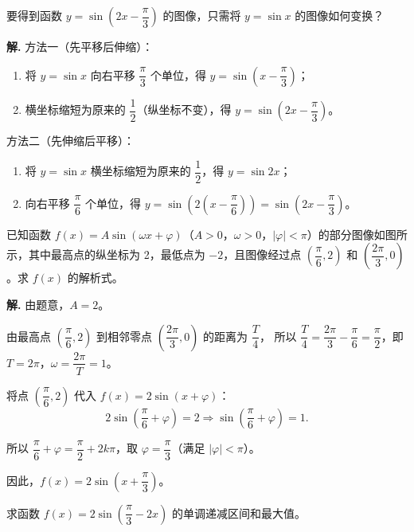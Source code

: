 \documentclass[11pt]{ctexrep}
\begin{document}
\begin{example}[图像变换]
    要得到函数 $y = \sin\left(2x - \dfrac{\pi}{3}\right)$ 的图像，只需将 $y = \sin x$ 的图像如何变换？
\end{example}

\textbf{解.} 方法一（先平移后伸缩）：
\begin{enumerate}
    \item 将 $y = \sin x$ 向右平移 $\dfrac{\pi}{3}$ 个单位，得 $y = \sin\left(x - \dfrac{\pi}{3}\right)$；
    \item 横坐标缩短为原来的 $\dfrac{1}{2}$（纵坐标不变），得 $y = \sin\left(2x - \dfrac{\pi}{3}\right)$。
\end{enumerate}

方法二（先伸缩后平移）：
\begin{enumerate}
    \item 将 $y = \sin x$ 横坐标缩短为原来的 $\dfrac{1}{2}$，得 $y = \sin 2x$；
    \item 向右平移 $\dfrac{\pi}{6}$ 个单位，得 $y = \sin\left(2\left(x - \dfrac{\pi}{6}\right)\right) = \sin\left(2x - \dfrac{\pi}{3}\right)$。
\end{enumerate}

\begin{example}[由图像求解析式]
    已知函数 $f(x) = A\sin(\omega x + \varphi)$（$A > 0$，$\omega > 0$，$|\varphi| < \pi$）的部分图像如图所示，其中最高点的纵坐标为 2，最低点为 $-2$，且图像经过点 $\left(\dfrac{\pi}{6}, 2\right)$ 和 $\left(\dfrac{2\pi}{3}, 0\right)$。求 $f(x)$ 的解析式。
\end{example}

\textbf{解.} 由题意，$A = 2$。

由最高点 $\left(\dfrac{\pi}{6}, 2\right)$ 到相邻零点 $\left(\dfrac{2\pi}{3}, 0\right)$ 的距离为 $\dfrac{T}{4}$，
所以 $\dfrac{T}{4} = \dfrac{2\pi}{3} - \dfrac{\pi}{6} = \dfrac{\pi}{2}$，即 $T = 2\pi$，$\omega = \dfrac{2\pi}{T} = 1$。

将点 $\left(\dfrac{\pi}{6}, 2\right)$ 代入 $f(x) = 2\sin(x + \varphi)$：
\[
    2\sin\left(\frac{\pi}{6} + \varphi\right) = 2 \Rightarrow \sin\left(\frac{\pi}{6} + \varphi\right) = 1.
\]

所以 $\dfrac{\pi}{6} + \varphi = \dfrac{\pi}{2} + 2k\pi$，取 $\varphi = \dfrac{\pi}{3}$（满足 $|\varphi| < \pi$）。

因此，$f(x) = 2\sin\left(x + \dfrac{\pi}{3}\right)$。

\begin{example}[求单调区间与最值]
    求函数 $f(x) = 2\sin\left(\dfrac{\pi}{3} - 2x\right)$ 的单调递减区间和最大值。
\end{example}
\end{document}
